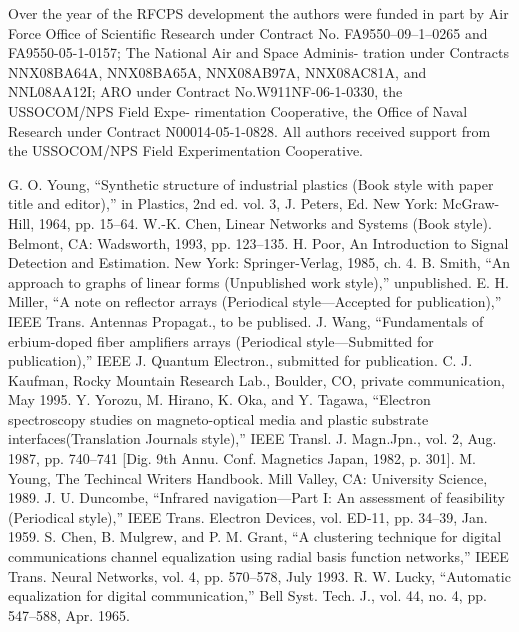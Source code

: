 \documentclass[letterpaper, 10 pt, conference]{ieeeconf}  %
\begin{document}
Over the year of the RFCPS development the authors were funded in part by Air Force Office of Scientific Research under Contract No. FA9550–09–1–0265 and FA9550-05-1-0157; The National Air and Space Adminis- tration under Contracts NNX08BA64A, NNX08BA65A, NNX08AB97A, NNX08AC81A, and NNL08AA12I; ARO under Contract No.W911NF-06-1-0330, the USSOCOM/NPS Field Expe- rimentation Cooperative, the Office of Naval Research under Contract N00014-05-1-0828. All authors received support from the USSOCOM/NPS Field Experimentation Cooperative.




\begin{thebibliography}{99}

 G. O. Young, “Synthetic structure of industrial plastics (Book style with paper title and editor),” 	in Plastics, 2nd ed. vol. 3, J. Peters, Ed.  New York: McGraw-Hill, 1964, pp. 15–64.
 W.-K. Chen, Linear Networks and Systems (Book style).	Belmont, CA: Wadsworth, 1993, pp. 123–135.
 H. Poor, An Introduction to Signal Detection and Estimation.   New York: Springer-Verlag, 1985, ch. 4.
 B. Smith, “An approach to graphs of linear forms (Unpublished work style),” unpublished.
 E. H. Miller, “A note on reflector arrays (Periodical style—Accepted for publication),” IEEE Trans. Antennas Propagat., to be publised.
 J. Wang, “Fundamentals of erbium-doped fiber amplifiers arrays (Periodical style—Submitted for publication),” IEEE J. Quantum Electron., submitted for publication.
 C. J. Kaufman, Rocky Mountain Research Lab., Boulder, CO, private communication, May 1995.
 Y. Yorozu, M. Hirano, K. Oka, and Y. Tagawa, “Electron spectroscopy studies on magneto-optical media and plastic substrate interfaces(Translation Journals style),” IEEE Transl. J. Magn.Jpn., vol. 2, Aug. 1987, pp. 740–741 [Dig. 9th Annu. Conf. Magnetics Japan, 1982, p. 301].
 M. Young, The Techincal Writers Handbook.  Mill Valley, CA: University Science, 1989.
 J. U. Duncombe, “Infrared navigation—Part I: An assessment of feasibility (Periodical style),” IEEE Trans. Electron Devices, vol. ED-11, pp. 34–39, Jan. 1959.
 S. Chen, B. Mulgrew, and P. M. Grant, “A clustering technique for digital communications channel equalization using radial basis function networks,” IEEE Trans. Neural Networks, vol. 4, pp. 570–578, July 1993.
 R. W. Lucky, “Automatic equalization for digital communication,” Bell Syst. Tech. J., vol. 44, no. 4, pp. 547–588, Apr. 1965.

\end{thebibliography}
\end{document}
